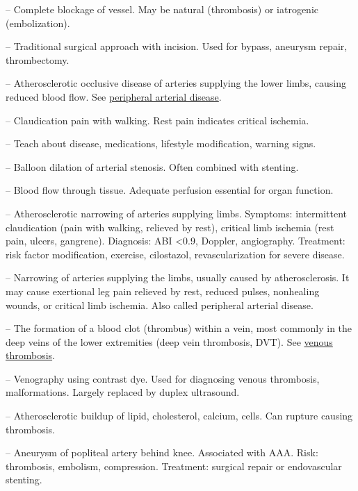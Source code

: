 -- Complete blockage of vessel. May be natural (thrombosis) or iatrogenic (embolization).

-- Traditional surgical approach with incision. Used for bypass, aneurysm repair, thrombectomy.


-- Atherosclerotic occlusive disease of arteries supplying the lower limbs, causing reduced blood flow. See \hyperlink{Peripheral Arterial Disease}{peripheral arterial disease}.

-- Claudication pain with walking. Rest pain indicates critical ischemia.

-- Teach about disease, medications, lifestyle modification, warning signs.

-- Balloon dilation of arterial stenosis. Often combined with stenting.

-- Blood flow through tissue. Adequate perfusion essential for organ function.

-- Atherosclerotic narrowing of arteries supplying limbs. Symptoms: intermittent claudication (pain with walking, relieved by rest), critical limb ischemia (rest pain, ulcers, gangrene). Diagnosis: ABI <0.9, Doppler, angiography. Treatment: risk factor modification, exercise, cilostazol, revascularization for severe disease.

-- Narrowing of arteries supplying the limbs, usually caused by atherosclerosis. It may cause exertional leg pain relieved by rest, reduced pulses, nonhealing wounds, or critical limb ischemia. Also called peripheral arterial disease.

-- The formation of a blood clot (thrombus) within a vein, most commonly in the deep veins of the lower extremities (deep vein thrombosis, DVT). See \hyperlink{Venous Thrombosis}{venous thrombosis}.

-- Venography using contrast dye. Used for diagnosing venous thrombosis, malformations. Largely replaced by duplex ultrasound.


-- Atherosclerotic buildup of lipid, cholesterol, calcium, cells. Can rupture causing thrombosis.


-- Aneurysm of popliteal artery behind knee. Associated with AAA. Risk: thrombosis, embolism, compression. Treatment: surgical repair or endovascular stenting.

